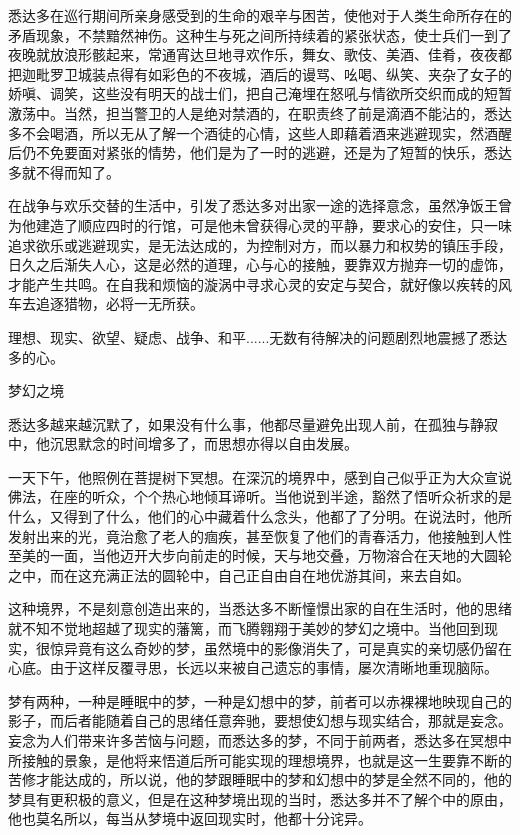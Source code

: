 \documentclass[12pt,twoside,openany]{book}
\begin{document}
悉达多在巡行期间所亲身感受到的生命的艰辛与困苦，使他对于人类生命所存在的矛盾现象，不禁黯然神伤。这种生与死之间所持续着的紧张状态，使士兵们一到了夜晚就放浪形骸起来，常通宵达旦地寻欢作乐，舞女、歌伎、美酒、佳肴，夜夜都把迦毗罗卫城装点得有如彩色的不夜城，酒后的谩骂、吆喝、纵笑、夹杂了女子的娇嗔、调笑，这些没有明天的战士们，把自己淹埋在怒吼与情欲所交织而成的短暂激荡中。当然，担当警卫的人是绝对禁酒的，在职责终了前是滴酒不能沾的，悉达多不会喝酒，所以无从了解一个酒徒的心情，这些人即藉着酒来逃避现实，然酒醒后仍不免要面对紧张的情势，他们是为了一时的逃避，还是为了短暂的快乐，悉达多就不得而知了。

在战争与欢乐交替的生活中，引发了悉达多对出家一途的选择意念，虽然净饭王曾为他建造了顺应四时的行馆，可是他未曾获得心灵的平静，要求心的安住，只一味追求欲乐或逃避现实，是无法达成的，为控制对方，而以暴力和权势的镇压手段，日久之后渐失人心，这是必然的道理，心与心的接触，要靠双方抛弃一切的虚饰，才能产生共鸣。在自我和烦恼的漩涡中寻求心灵的安定与契合，就好像以疾转的风车去追逐猎物，必将一无所获。

理想、现实、欲望、疑虑、战争、和平......无数有待解决的问题剧烈地震撼了悉达多的心。

梦幻之境

悉达多越来越沉默了，如果没有什么事，他都尽量避免出现人前，在孤独与静寂中，他沉思默念的时间增多了，而思想亦得以自由发展。

一天下午，他照例在菩提树下冥想。在深沉的境界中，感到自己似乎正为大众宣说佛法，在座的听众，个个热心地倾耳谛听。当他说到半途，豁然了悟听众祈求的是什么，又得到了什么，他们的心中藏着什么念头，他都了了分明。在说法时，他所发射出来的光，竟治愈了老人的痼疾，甚至恢复了他们的青春活力，他接触到人性至美的一面，当他迈开大步向前走的时候，天与地交叠，万物溶合在天地的大圆轮之中，而在这充满正法的圆轮中，自己正自由自在地优游其间，来去自如。

这种境界，不是刻意创造出来的，当悉达多不断憧憬出家的自在生活时，他的思绪就不知不觉地超越了现实的藩篱，而飞腾翱翔于美妙的梦幻之境中。当他回到现实，很惊异竟有这么奇妙的梦，虽然境中的影像消失了，可是真实的亲切感仍留在心底。由于这样反覆寻思，长远以来被自己遗忘的事情，屡次清晰地重现脑际。

梦有两种，一种是睡眠中的梦，一种是幻想中的梦，前者可以赤裸裸地映现自己的影子，而后者能随着自己的思绪任意奔驰，要想使幻想与现实结合，那就是妄念。妄念为人们带来许多苦恼与问题，而悉达多的梦，不同于前两者，悉达多在冥想中所接触的景象，是他将来悟道后所可能实现的理想境界，也就是这一生要靠不断的苦修才能达成的，所以说，他的梦跟睡眠中的梦和幻想中的梦是全然不同的，他的梦具有更积极的意义，但是在这种梦境出现的当时，悉达多并不了解个中的原由，他也莫名所以，每当从梦境中返回现实时，他都十分诧异。
\end{document}
